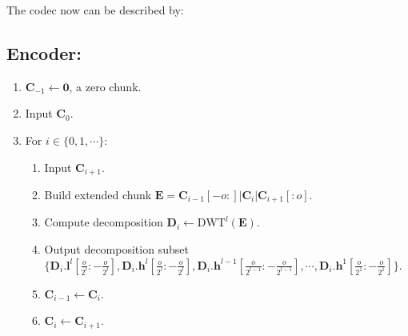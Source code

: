 
The codec now can be described by:

\subsection*{Encoder:}
\begin{enumerate}
\item ${\mathbf C}_{-1}\leftarrow{\mathbf 0}$, a zero chunk.
\item Input ${\mathbf C}_0$.
\item For $i\in\{0,1,\cdots\}$:   
  \begin{enumerate}               
  \item Input ${\mathbf C}_{i+1}$.
  \item Build extended chunk ${\mathbf E} = {\mathbf
    C}_{i-1}[-o:]|{\mathbf C}_i|{\mathbf C}_{i+1}[:o]$.
  \item Compute decomposition ${\mathbf D}_i \leftarrow
    \text{DWT}^l({\mathbf E})$.
  \item Output decomposition subset
    $\Big\{{\mathbf D}_i.{\mathbf l}^l[\frac{o}{2^l}:-\frac{o}{2^l}], {\mathbf
      D}_i.{\mathbf h}^l[\frac{o}{2^l}:-\frac{o}{2^l}], {\mathbf D}_i.{\mathbf
      h}^{l-1}[\frac{o}{2^{l-1}}:-\frac{o}{2^{l-1}}], \cdots, {\mathbf D}_i.{\mathbf
      h}^1[\frac{o}{2^1}:-\frac{o}{2^1}]\Big\}$.
  \item ${\mathbf C}_{i-1}\leftarrow {\mathbf C}_i$.
  \item ${\mathbf C}_i\leftarrow {\mathbf C}_{i+1}$.
  \end{enumerate}
\end{enumerate}

